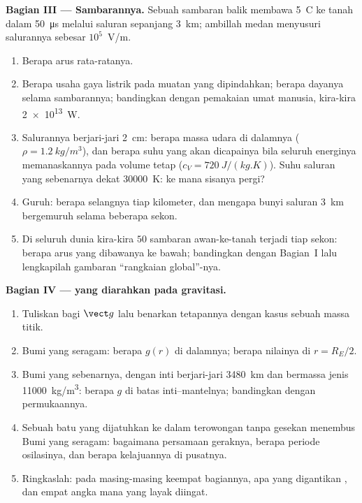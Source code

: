 \begin{problem}
\medskip
\noindent\textbf{Bagian III --- Sambarannya.}
Sebuah sambaran balik membawa \qty{5}{C} ke tanah dalam \qty{50}{\micro s}
melalui saluran sepanjang \qty{3}{km}; ambillah medan menyusuri salurannya
sebesar $10^5$~V/m.
\begin{enumerate}[resume]
  \item Berapa arus rata-ratanya.
  \item Berapa usaha gaya listrik pada muatan yang dipindahkan; berapa dayanya
        selama sambarannya; bandingkan dengan pemakaian 
        umat manusia, kira-kira \qty{2e13}{W}.
  \item Salurannya berjari-jari \qty{2}{cm}: berapa massa udara di dalamnya
        ($\rho = \qty{1.2}{kg/m^3}$), dan berapa suhu yang akan dicapainya bila
        seluruh energinya memanaskannya pada volume tetap ($c_V =
        \qty{720}{J/(kg.K)}$). Suhu saluran yang sebenarnya dekat
        \qty{30000}{K}: ke mana sisanya pergi?
  \item Guruh: berapa selangnya tiap kilometer, dan mengapa bunyi
        saluran \qty{3}{km} bergemuruh selama beberapa sekon.
  \item Di seluruh dunia kira-kira $50$ sambaran awan-ke-tanah terjadi tiap sekon:
        berapa arus yang dibawanya ke bawah; bandingkan dengan Bagian~I lalu lengkapilah
        gambaran ``rangkaian global''-nya.
\end{enumerate}

\medskip
\noindent\textbf{Bagian IV ---  yang diarahkan pada gravitasi.}
\begin{enumerate}[resume]
  \item Tuliskan  bagi  $\vect g$ lalu
        benarkan tetapannya dengan kasus sebuah massa titik.
  \item Bumi yang seragam: berapa $g(r)$ di dalamnya; berapa nilainya di $r = R_E/2$.
  \item Bumi yang sebenarnya, dengan inti berjari-jari \qty{3480}{km} dan bermassa jenis
        \qty{11000}{kg/m^3}: berapa $g$ di batas inti--mantelnya; bandingkan dengan
        permukaannya.
  \item Sebuah batu yang dijatuhkan ke dalam terowongan tanpa gesekan menembus Bumi
        yang seragam: bagaimana persamaan geraknya, berapa periode osilasinya, dan berapa kelajuannya di
        pusatnya.
  \item Ringkaslah: pada masing-masing keempat bagiannya, apa yang digantikan ,
        dan empat angka mana yang layak diingat.
\end{enumerate}
\end{problem}
